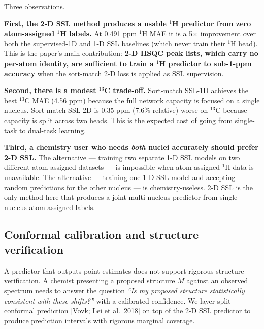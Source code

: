 \documentclass[11pt,a4paper]{article}
\begin{document}
Three observations.

\textbf{First, the 2-D SSL method produces a usable \(^{1}\)H predictor from zero atom-assigned \(^{1}\)H labels.} At 0.491 ppm \(^{1}\)H MAE it is a 5\(\times\) improvement over both the supervised-1D and 1-D SSL baselines (which never train their \(^{1}\)H head). This is the paper's main contribution: \textbf{2-D HSQC peak lists, which carry no per-atom identity, are sufficient to train a \(^{1}\)H predictor to sub-1-ppm accuracy} when the sort-match 2-D loss is applied as SSL supervision.

\textbf{Second, there is a modest \(^{13}\)C trade-off.} Sort-match SSL-1D achieves the best \(^{13}\)C MAE (4.56 ppm) because the full network capacity is focused on a single nucleus. Sort-match SSL-2D is 0.35 ppm (7.6\% relative) worse on \(^{13}\)C because capacity is split across two heads. This is the expected cost of going from single-task to dual-task learning.

\textbf{Third, a chemistry user who needs \emph{both} nuclei accurately should prefer 2-D SSL.} The alternative --- training two separate 1-D SSL models on two different atom-assigned datasets --- is impossible when atom-assigned \(^{1}\)H data is unavailable. The alternative --- training one 1-D SSL model and accepting random predictions for the other nucleus --- is chemistry-useless. 2-D SSL is the only method here that produces a joint multi-nucleus predictor from single-nucleus atom-assigned labels.

\subsection{Conformal calibration and structure verification}\label{conformal-calibration-and-structure-verification}

A predictor that outputs point estimates does not support rigorous structure verification. A chemist presenting a proposed structure \(M\) against an observed spectrum needs to answer the question \emph{``Is my proposed structure statistically consistent with these shifts?''} with a calibrated confidence. We layer split-conformal prediction {[}Vovk; Lei et al.~2018{]} on top of the 2-D SSL predictor to produce prediction intervals with rigorous marginal coverage.
\end{document}
